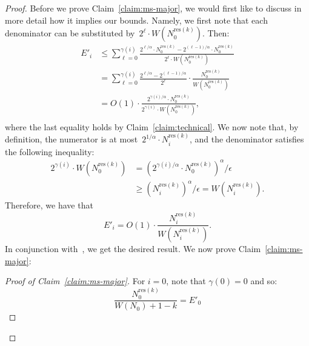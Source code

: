 \documentclass[sigconf]{acmart}
\newcommand{\parentheses}[1]{\left(#1\right)}
\begin{document}
\begin{proof}
    Before we prove Claim~\ref{claim:ms-major}, we would first like to discuss
    in more detail how it implies our bounds. Namely, we first note that each
    denominator can be substituted by~$2^{\ell} \cdot
    W\parentheses{N^{\text{res}(k)}_0}$. Then:
    \begin{align*}
        E'_i &\leq  \sum_{\ell=0}^{\gamma(i)} \frac{2^{\ell/\alpha} \cdot N^{\text{res}(k)}_0 - 2^{(\ell-1)/\alpha} \cdot N^{\text{res}(k)}_0}{2^{\ell} \cdot W\parentheses{N^{\text{res}(k)}_0 }} \\
        & =  \sum_{\ell=0}^{\gamma(i)} \frac{2^{\ell/\alpha} - 2^{(\ell-1)/\alpha} }{2^{\ell}}  \cdot \frac{N^{\text{res}(k)}_0}{W\parentheses{N^{\text{res}(k)}_0 }}\\
        & = O(1) \cdot  \frac{2^{\gamma(i)/\alpha} \cdot N^{\text{res}(k)}_0}{2^{\gamma(i)} \cdot W\parentheses{N^{\text{res}(k)}_0 }}, \\
    \end{align*}
    where the last equality holds by Claim~\ref{claim:technical}. We now note
    that, by definition, the numerator is at most~$2^{1/\alpha} \cdot
    N^{\text{res}(k)}_i$, and the denominator satisfies the following
    inequality:
    \begin{align*}
        2^{\gamma(i)} \cdot W\parentheses{N^{\text{res}(k)}_0 } &= 	\parentheses{2^{\gamma(i)/\alpha} \cdot N^{\text{res}(k)}_0}^\alpha /\epsilon \\
        & \geq \parentheses{N^{\text{res}(k)}_i}^\alpha /\epsilon=W\parentheses{N^{\text{res}(k)}_i}.
    \end{align*}
    Therefore, we have that
    $$ E'_i = O(1) \cdot \frac{ N^{\text{res}(k)}_i}{ W\parentheses{N^{\text{res}(k)}_i }}. $$
    In conjunction with~, we get the desired result. We
    now prove Claim~\ref{claim:ms-major}:
    \begin{proof}[Proof of Claim~\ref{claim:ms-major}]
        For $i=0$, note that $\gamma(0)=0$ and so:
        $$ \frac{N^{\text{res}(k)}_0}{W(N_0)+1-k} = E'_0$$


\end{proof}
\end{proof}
\end{document}
